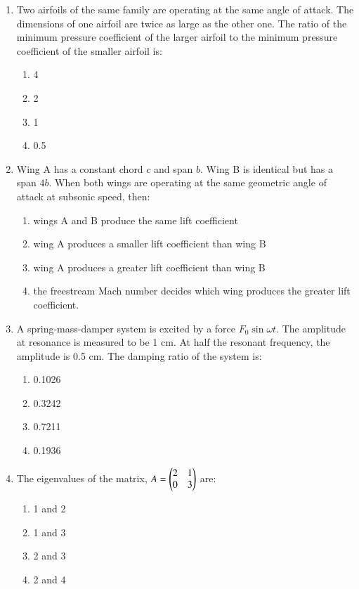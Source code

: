 \documentclass[journal]{IEEEtran}
\theoremstyle{remark}
\begin{document}
\begin{enumerate}[start=18]
\item  Two airfoils of the same family are operating at the same angle of attack. The dimensions of one airfoil are twice as large as the other one. The ratio of the minimum pressure coefficient of the larger airfoil to the minimum pressure coefficient of the smaller airfoil is: 
\begin{multicols}{4}
\begin{enumerate}
\item 4
\item 2
\item 1
\item 0.5
\end{enumerate}
\end{multicols}

\item  Wing A has a constant chord $c$ and span $b$. Wing B is identical but has a span $4b$. When both wings are operating at the same geometric angle of attack at subsonic speed, then:
\begin{enumerate}
\item wings A and B produce the same lift coefficient
\item wing A produces a smaller lift coefficient than wing B
\item wing A produces a greater lift coefficient than wing B
\item the freestream Mach number decides which wing produces the greater lift coefficient.
\end{enumerate}

\item  A spring-mass-damper system is excited by a force $F_0 \sin \omega t$. The amplitude at resonance is measured to be 1 cm. At half the resonant frequency, the amplitude is 0.5 cm. The damping ratio of the system is:
\begin{multicols}{4}
\begin{enumerate}
\item 0.1026
\item 0.3242
\item 0.7211
\item 0.1936
\end{enumerate}
\end{multicols}

\item  The eigenvalues of the matrix, 
$ A = \begin{pmatrix}2 & 1 \\0 & 3\end{pmatrix}$
are:
\begin{multicols}{4}
\begin{enumerate}
\item 1 and 2
\item 1 and 3
\item 2 and 3
\item 2 and 4
\end{enumerate}
\end{multicols}


\end{enumerate}
\end{document}
